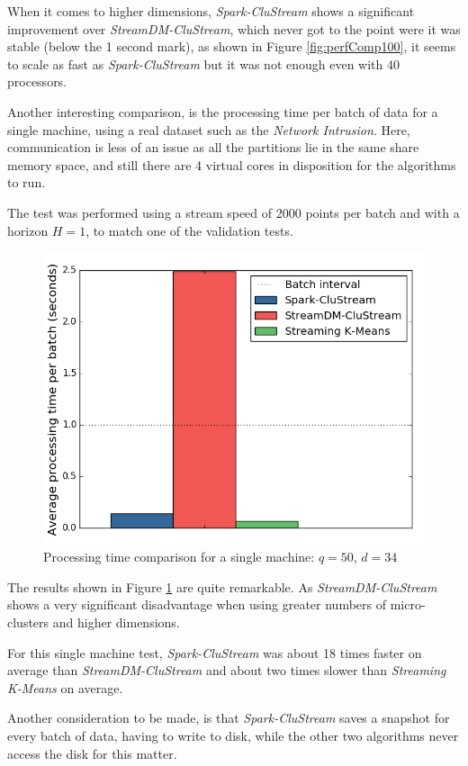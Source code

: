 When it comes to higher dimensions, \textit{Spark-CluStream} shows a significant improvement over \textit{StreamDM-CluStream}, which never got to the point were it was stable (below the 1 second mark), as shown in Figure \ref{fig:perfComp100}, it seems to scale as fast as \textit{Spark-CluStream} but it was not enough even with 40 processors. 


Another interesting comparison, is the processing time per batch of data for a single machine, using a real dataset such as the \textit{Network Intrusion}. Here, communication is less of an issue as all the partitions lie in the same share memory space, and still there are 4 virtual cores in disposition for the algorithms to run. 

The test was performed using a stream speed of 2000 points per batch and with a horizon $H=1$, to match one of the validation tests.

\begin{figure}[h!]
 \centering
 \includegraphics[scale=0.47]{./styles/singlemachine.png}
 \caption{Processing time comparison for a single machine: $q=50$, $d=34$}
 \label{fig:singlemachine}
\end{figure}

The results shown in Figure \ref{fig:singlemachine} are quite remarkable. As \textit{StreamDM-CluStream} shows a very significant disadvantage when using greater numbers of micro-clusters and higher dimensions.

For this single machine test, \textit{Spark-CluStream} was about 18 times faster on average than \textit{StreamDM-CluStream} and about two times slower than \textit{Streaming K-Means} on average.

Another consideration to be made, is that  \textit{Spark-CluStream} saves a snapshot for every batch of data, having to write to disk, while the other two algorithms never access the disk for this matter.


